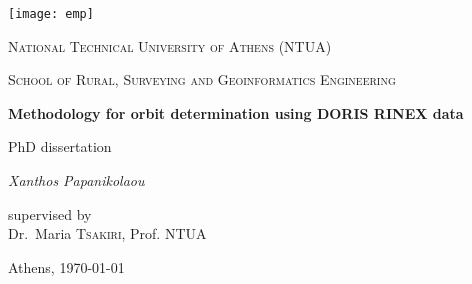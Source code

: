\begin{titlepage}
  \centering
  \texttt{[image: emp]}\par\vspace{1cm}
  {\Large \textsc{National Technical University of Athens (NTUA)} \par}
  {\Large \textsc{School of Rural, Surveying and Geoinformatics Engineering} \par}
  \vspace{.5cm}
  {\huge\bfseries Methodology for orbit determination using DORIS RINEX data \par}
  \vspace{2cm}
  {\large PhD dissertation}\\
  \vspace{.15cm}
  {\Large\itshape Xanthos Papanikolaou\par}
  \vfill
  supervised by\\
  Dr.~Maria \textsc{Tsakiri}, Prof. NTUA
  \vfill
  {\large Athens, \today\par}
\end{titlepage}
\thispagestyle{empty}
